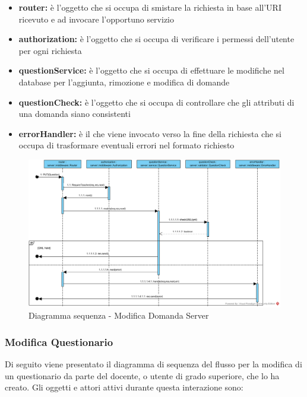 \documentclass[12pt,a4paper]{article}
\begin{document}
\begin{itemize}
	\item \textbf{router:} è l'oggetto che si occupa di smistare la richiesta in base all’URI ricevuto e ad invocare l’opportuno servizio
	\item \textbf{authorization:} è l'oggetto che si occupa di verificare i permessi dell'utente per ogni richiesta	
	\item \textbf{questionService:} è l'oggetto che si occupa di effettuare le modifiche nel database per l'aggiunta, rimozione e modifica di domande
	\item \textbf{questionCheck:} è l'oggetto che si occupa di controllare che gli attributi di una domanda siano consistenti
	\item \textbf{errorHandler:} è il  che viene invocato verso la fine della richiesta che si occupa di trasformare eventuali errori nel formato  richiesto
\end{itemize}

\begin{center}
	\begin{figure}[H]
		\centering \includegraphics[max width=\myheight, angle=90]{../img/diagrammiSequenza/modificaDomandaServer.png}
		\caption{Diagramma sequenza - Modifica Domanda Server}
	\end{figure}
\end{center}

\newpage
\subsubsection{Modifica Questionario}
Di seguito viene presentato il diagramma di sequenza del flusso per la modifica di un questionario da parte del docente, o utente di grado superiore, che lo ha creato. Gli oggetti e attori attivi durante questa interazione sono:
\end{document}
